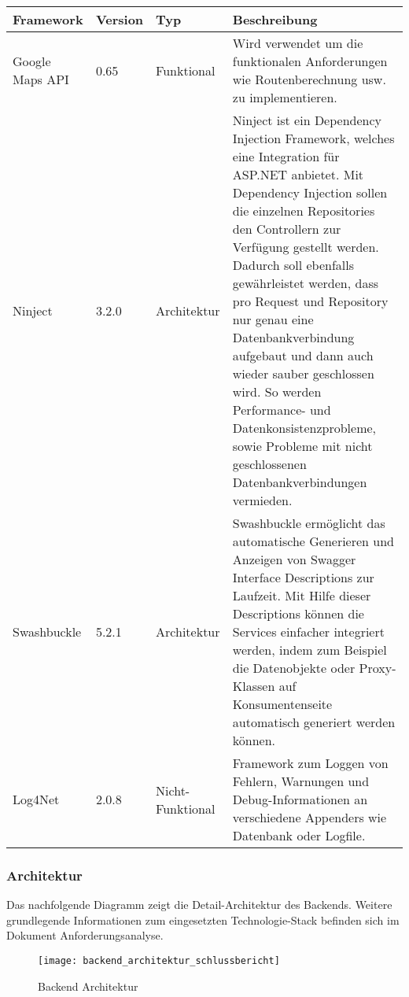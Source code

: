 \begin{longtabu} to \textwidth { | l | l | l | X[l] | }
\hline
\textbf{Framework} & \textbf{Version}  & \textbf{Typ} & \textbf{Beschreibung} \\
\hline
\endhead

Google Maps API &
0.65 &
Funktional &
Wird verwendet um die funktionalen Anforderungen wie Routenberechnung usw. zu
  implementieren.\\\hline
Ninject &
3.2.0 &
Architektur &
Ninject ist ein Dependency Injection Framework, welches eine Integration f\"ur ASP.NET
  anbietet. Mit Dependency Injection sollen die einzelnen Repositories den Controllern zur Verf\"ugung gestellt werden.
  Dadurch soll ebenfalls gew\"ahrleistet werden, dass pro Request und Repository nur genau eine Datenbankverbindung
  aufgebaut und dann auch wieder sauber geschlossen wird. So werden Performance- und Datenkonsistenzprobleme, sowie
  Probleme mit nicht geschlossenen Datenbankverbindungen vermieden.\\\hline
Swashbuckle &
5.2.1 &
Architektur &
Swashbuckle erm\"oglicht das automatische Generieren und Anzeigen von Swagger Interface
  Descriptions zur Laufzeit. Mit Hilfe dieser Descriptions k\"onnen die Services einfacher integriert werden, indem zum
  Beispiel die Datenobjekte oder Proxy-Klassen auf Konsumentenseite automatisch generiert werden k\"onnen.\\\hline
Log4Net &
2.0.8 &
Nicht-Funktional &
Framework zum Loggen von Fehlern, Warnungen und Debug-Informationen an verschiedene
  Appenders wie Datenbank oder Logfile.\\\hline
\end{longtabu}


\subsubsection{Architektur}\label{backendarchitektur}
Das nachfolgende Diagramm zeigt die Detail-Architektur des Backends. Weitere grundlegende
Informationen zum eingesetzten Technologie-Stack befinden sich im Dokument Anforderungsanalyse.

\begin{figure}
  \centering
  \texttt{[image: backend\_architektur\_schlussbericht]}
  \caption{Backend Architektur}
\end{figure}

